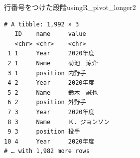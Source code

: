 \begin{Rscreen}{行番号をつけた段階}{usingR_pivot_longer2}
	\begin{verbatim}
# A tibble: 1,992 × 3
   ID    name     value         
   <chr> <chr>    <chr>         
 1 1     Year     2020年度      
 2 1     Name     菊池　涼介    
 3 1     position 内野手        
 4 2     Year     2020年度      
 5 2     Name     鈴木　誠也    
 6 2     position 外野手        
 7 3     Year     2020年度      
 8 3     Name     Ｋ．ジョンソン
 9 3     position 投手          
10 4     Year     2020年度      
# … with 1,982 more rows
\end{verbatim}
\end{Rscreen}
